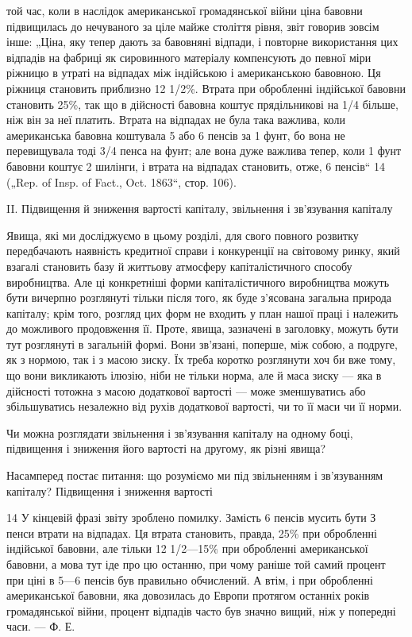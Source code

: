 той час, коли в наслідок американської громадянської війни ціна
бавовни підвищилась до нечуваного за ціле майже століття
рівня, звіт говорив зовсім інше: „Ціна, яку тепер дають за бавовняні
відпади, і повторне використання цих відпадів на
фабриці як сировинного матеріалу компенсують до певної міри
ріжницю в утраті на відпадах між індійською і американською
бавовною. Ця ріжниця становить приблизно 12 1/2\%. Втрата при
обробленні індійської бавовни становить 25\%, так що в дійсності
бавовна коштує прядільникові на 1/4 більше, ніж він за неї
платить. Втрата на відпадах не була така важлива, коли американська
бавовна коштувала 5 або 6 пенсів за 1 фунт, бо вона
не перевищувала тоді 3/4 пенса на фунт; але вона дуже важлива
тепер, коли 1 фунт бавовни коштує 2 шилінги, і втрата на відпадах
становить, отже, 6 пенсів“ 14 („Rep. of Insp. of Fact., Oct.
1863“, стор. 106).

II. Підвищення й зниження вартості капіталу, звільнення
і зв’язування капіталу

Явища, які ми досліджуємо в цьому розділі, для свого повного
розвитку передбачають наявність кредитної справи і конкуренції
на світовому ринку, який взагалі становить базу й життьову атмосферу
капіталістичного способу виробництва. Але ці конкретніші
форми капіталістичного виробництва можуть бути вичерпно розглянуті
тільки після того, як буде з’ясована загальна природа
капіталу; крім того, розгляд цих форм не входить у план нашої
праці і належить до можливого продовження її. Проте, явища,
зазначені в заголовку, можуть бути тут розглянуті в загальній
формі. Вони зв’язані, поперше, між собою, а подруге, як
з нормою, так і з масою зиску. Їх треба коротко розглянути
хоч би вже тому, що вони викликають ілюзію, ніби не тільки
норма, але й маса зиску — яка в дійсності тотожна з масою
додаткової вартості — може зменшуватись або збільшуватись
незалежно від рухів додаткової вартості, чи то її маси чи її
норми.

Чи можна розглядати звільнення і зв’язування капіталу на
одному боці, підвищення і зниження його вартості на другому,
як різні явища?

Насамперед постає питання: що розуміємо ми під звільненням
і зв’язуванням капіталу? Підвищення і зниження вартості

14 У кінцевій фразі звіту зроблено помилку. Замість 6 пенсів мусить бути З
пенси втрати на відпадах. Ця втрата становить, правда, 25\% при обробленні
індійської бавовни, але тільки 12 1/2—15\% при обробленні американської бавовни,
а мова тут іде про цю останню, при чому раніше той самий процент при
ціні в 5—6 пенсів був правильно обчислений. А втім, і при обробленні американської
бавовни, яка довозилась до Европи протягом останніх років громадянської
війни, процент відпадів часто був значно вищий, ніж у попередні
часи. — Ф. Е.
